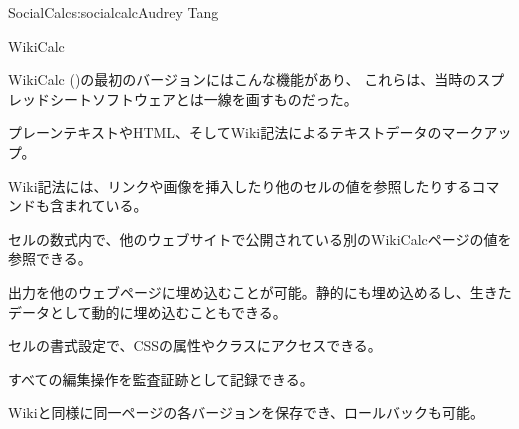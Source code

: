 \begin{aosachapter}{SocialCalc}{s:socialcalc}{Audrey Tang}
\begin{aosasect1}{WikiCalc}

WikiCalc ()の最初のバージョンにはこんな機能があり、
これらは、当時のスプレッドシートソフトウェアとは一線を画すものだった。

\begin{aosaitemize}

  \item プレーンテキストやHTML、そしてWiki記法によるテキストデータのマークアップ。

  \item Wiki記法には、リンクや画像を挿入したり他のセルの値を参照したりするコマンドも含まれている。

  \item セルの数式内で、他のウェブサイトで公開されている別のWikiCalcページの値を参照できる。

  \item 出力を他のウェブページに埋め込むことが可能。静的にも埋め込めるし、生きたデータとして動的に埋め込むこともできる。

  \item セルの書式設定で、CSSの属性やクラスにアクセスできる。

  \item すべての編集操作を監査証跡として記録できる。

  \item Wikiと同様に同一ページの各バージョンを保存でき、ロールバックも可能。


\end{aosaitemize}
\end{aosasect1}
\end{aosachapter}
